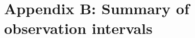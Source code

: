 \chapter{Appendix B: Summary of observation intervals}\label{appendix:observation-periods}
\renewcommand{\thechapter}{B}
\setcounter{table}{0} 

\begin{landscape}
\begin{spacing}{.5}
    
    \label{tab:msh-observations}
\end{spacing}
\end{landscape}

\begin{landscape}
\begin{spacing}{.5}
    
    \label{tab:sw-observations}
\end{spacing}
\end{landscape}